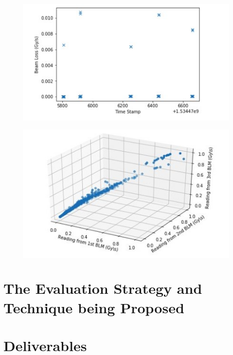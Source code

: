 \documentclass[12pt, twoside]{report}
\begin{document}
	\begin{figure}[t]
		\centering
		\begin{minipage}{.5\textwidth}
			\centering
			\includegraphics[width=\linewidth]{BLM1}
			\label{fig:BLMlosses}
		\end{minipage}%
		\begin{minipage}{.5\textwidth}
			\centering
			\includegraphics[width=\linewidth]{BLM2}
			\label{fig:BLMscatter}
		\end{minipage}
	\end{figure}
	
	
	\section{The Evaluation Strategy and Technique being Proposed}
	
	\section{Deliverables}
	
\end{document}
